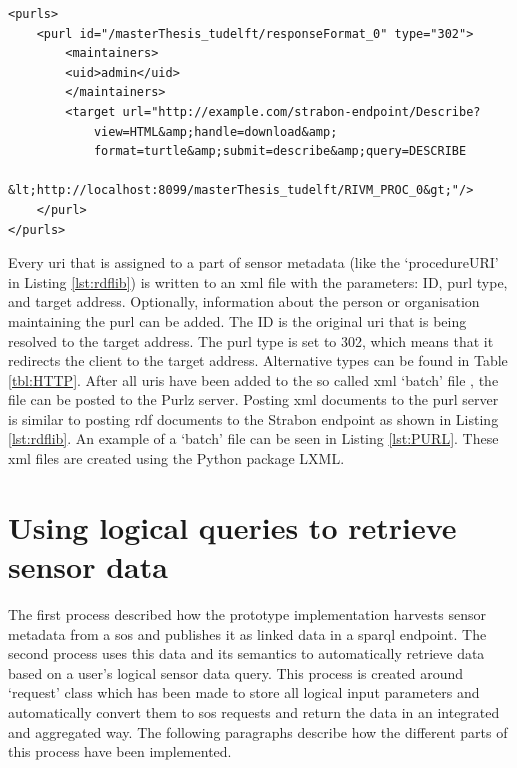 \begin{lstlisting}[float,caption={Example of a PURL batch file (containing one PURL)}, label={lst:PURL}]
<purls>
	<purl id="/masterThesis_tudelft/responseFormat_0" type="302">
		<maintainers>
		<uid>admin</uid>
		</maintainers>
		<target url="http://example.com/strabon-endpoint/Describe?
			view=HTML&amp;handle=download&amp;
			format=turtle&amp;submit=describe&amp;query=DESCRIBE 
			&lt;http://localhost:8099/masterThesis_tudelft/RIVM_PROC_0&gt;"/>
	</purl>
</purls>
\end{lstlisting}

Every \ac{uri} that is assigned to a part of sensor metadata (like the `procedureURI' in Listing \ref{lst:rdflib}) is written to an \ac{xml} file with the parameters: ID, \ac{purl} type, and target address. Optionally, information about the person or organisation maintaining the \ac{purl} can be added. The ID is the original \ac{uri} that is being resolved to the target address. The \ac{purl} type is set to 302, which means that it redirects the client to the target address. Alternative types can be found in Table \ref{tbl:HTTP}. After all \acp{uri} have been added to the so called \ac{xml} `batch' file \citep{LD:PURL2}, the file can be posted to the Purlz server. Posting \ac{xml} documents to the \ac{purl} server is similar to posting \ac{rdf} documents to the Strabon endpoint as shown in Listing \ref{lst:rdflib}. An example of a `batch' file can be seen in Listing \ref{lst:PURL}. These \ac{xml} files are created using the Python package LXML. 


\section{Using logical queries to retrieve sensor data}
\label{par:logicalQuery}
The first process described how the prototype implementation harvests sensor metadata from a \ac{sos} and publishes it as linked data in a \ac{sparql} endpoint. The second process uses this data and its semantics to automatically retrieve data based on a user's logical sensor data query. This process is created around `request' class which has been made to store all logical input parameters and automatically convert them to \ac{sos} requests and return the data in an integrated and aggregated way. The following paragraphs describe how the different parts of this process have been implemented.

